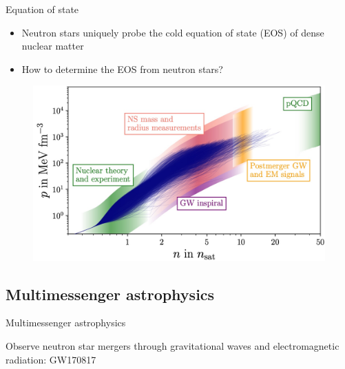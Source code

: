 \documentclass[usenames,dvipsnames,t]{beamer}
\begin{document}
\begin{frame}{Equation of state}

  \def\x{3mm}
  \def\y{1mm}

  \begin{itemize}
    \item Neutron stars uniquely probe the cold equation of state (EOS) of dense nuclear matter~\cite{Koehn:2024set}

    \vspace{\y}

    \item How to determine the EOS from neutron stars?
  \end{itemize}

  \vspace{\x}

  \begin{figure}
    \centering
    \includegraphics[width=0.80\linewidth]{Figures/Koehn_EOS.jpg}
  \end{figure}
\end{frame}







\subsection{Multimessenger astrophysics}


\begin{frame}{Multimessenger astrophysics}

  \def\x{2mm}
  
  Observe neutron star mergers through gravitational waves and electromagnetic radiation: GW170817~\cite{LIGOScientific:2017vwq, LIGOScientific:2017zic}

\end{frame}
\end{document}
